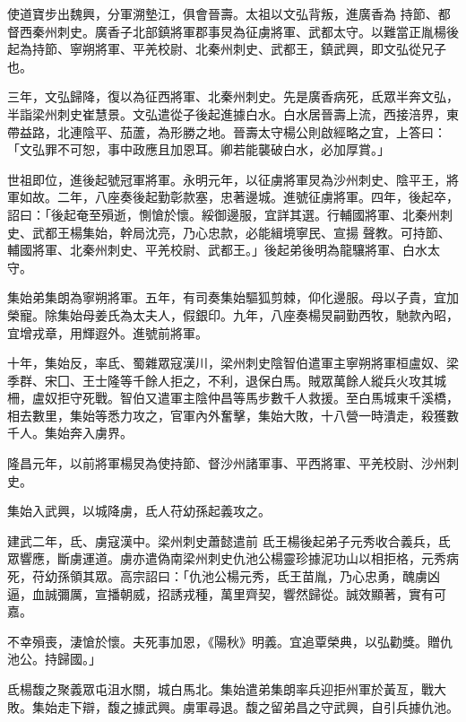 \begin{pinyinscope}
 使道寶步出魏興，分軍溯墊江，俱會晉壽。太祖以文弘背叛，進廣香為
 持節、都督西秦州刺史。廣香子北部鎮將軍郡事炅為征虜將軍、武都太守。以難當正胤楊後起為持節、寧朔將軍、平羌校尉、北秦州刺史、武都王，鎮武興，即文弘從兄子也。



 三年，文弘歸降，復以為征西將軍、北秦州刺史。先是廣香病死，氐眾半奔文弘，半詣梁州刺史崔慧景。文弘遣從子後起進據白水。白水居晉壽上流，西接涪界，東帶益路，北連陰平、茄蘆，為形勝之地。晉壽太守楊公則啟經略之宜，上答曰：「文弘罪不可恕，事中政應且加恩耳。卿若能襲破白水，必加厚賞。」



 世祖即位，進後起號冠軍將軍。永明元年，以征虜將軍炅為沙州刺史、陰平王，將軍如故。二年，八座奏後起勤彰款塞，忠著邊城。進號征虜將軍。四年，後起卒，詔曰：「後起奄至殞逝，惻愴於懷。綏御邊服，宜詳其選。行輔國將軍、北秦州刺史、武都王楊集始，幹局沈亮，乃心忠款，必能緝境寧民、宣揚
 聲教。可持節、輔國將軍、北秦州刺史、平羌校尉、武都王。」後起弟後明為龍驤將軍、白水太守。



 集始弟集朗為寧朔將軍。五年，有司奏集始驅狐剪棘，仰化邊服。母以子貴，宜加榮寵。除集始母姜氏為太夫人，假銀印。九年，八座奏楊炅嗣勤西牧，馳款內昭，宜增戎章，用輝遐外。進號前將軍。



 十年，集始反，率氐、蜀雜眾寇漢川，梁州刺史陰智伯遣軍主寧朔將軍桓盧奴、梁季群、宋囗、王士隆等千餘人拒之，不利，退保白馬。賊眾萬餘人縱兵火攻其城柵，盧奴拒守死戰。智伯又遣軍主陰仲昌等馬步數千人救援。至白馬城東千溪橋，相去數里，集始等悉力攻之，官軍內外奮擊，集始大敗，十八營一時潰走，殺獲數千人。集始奔入虜界。



 隆昌元年，以前將軍楊炅為使持節、督沙州諸軍事、平西將軍、平羌校尉、沙州刺史。



 集始入武興，以城降虜，氐人苻幼孫起義攻之。



 建武二年，氐、虜寇漢中。梁州刺史蕭懿遣前
 氐王楊後起弟子元秀收合義兵，氐眾響應，斷虜運道。虜亦遣偽南梁州刺史仇池公楊靈珍據泥功山以相拒格，元秀病死，苻幼孫領其眾。高宗詔曰：「仇池公楊元秀，氐王苗胤，乃心忠勇，醜虜凶逼，血誠彌厲，宣播朝威，招誘戎種，萬里齊契，響然歸從。誠效顯著，實有可嘉。



 不幸殞喪，淒愴於懷。夫死事加恩，《陽秋》明義。宜追覃榮典，以弘勸獎。贈仇池公。持歸國。」



 氐楊馥之聚義眾屯沮水關，城白馬北。集始遣弟集朗率兵迎拒州軍於黃亙，戰大敗。集始走下辯，馥之據武興。虜軍尋退。馥之留弟昌之守武興，自引兵據仇池。




\end{pinyinscope}
